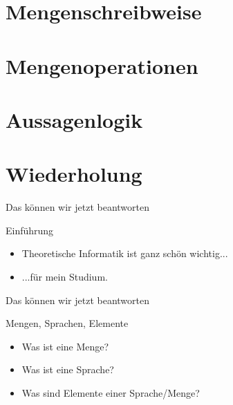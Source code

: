


\section{Mengenschreibweise}



\section{Mengenoperationen}



\section{Aussagenlogik}



\section{Wiederholung}
\begin{frame}[fragile]{Das können wir jetzt beantworten}
    \begin{alertblock}{Einführung}
    \begin{itemize}
        \item Theoretische Informatik ist ganz schön wichtig...
        \item ...für mein Studium.
    \end{itemize}
    \end{alertblock}
\end{frame}

\begin{frame}[fragile]{Das können wir jetzt beantworten}
    \begin{alertblock}{Mengen, Sprachen, Elemente}
    \begin{itemize}
        \item Was ist eine Menge?
        \item Was ist eine Sprache?
        \item Was sind Elemente einer Sprache/Menge?
    \end{itemize}
    \end{alertblock}
\end{frame}

